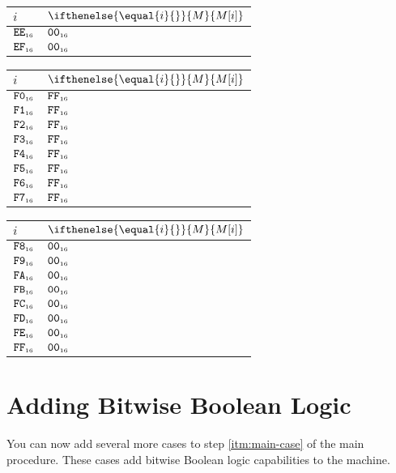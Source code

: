 \documentclass[a4paper,12pt]{article}
\makeatletter
\newcommand{\num}[1]{\texttt{#1}}
\newcommand{\hex}[1]{\num{#1}_{\textup{\tiny 16}}}
\newcommand{\MEM}[1]{\ifthenelse{\equal{#1}{}}{M}{M[#1]}}
\newenvironment{memtable}{%
  \begin{trivlist}
    \item
    }{%
    \end{trivlist}}
\newenvironment{memcolumn}{%
  \begin{tabular}{@{}ll@{}}
    $i$ & $\MEM{i}$ \\
    \hline}
    {%
    \hline
  \end{tabular}}
\newcommand{\memspace}{\qquad}
\makeatother
\begin{document}
\begin{memtable}
\begin{memcolumn}
    $\hex{EE}$ & $\hex{00}$ \\
    $\hex{EF}$ & $\hex{00}$ \\
  \end{memcolumn}
  \memspace
  \begin{memcolumn}
    $\hex{F0}$ & $\hex{FF}$ \\
    $\hex{F1}$ & $\hex{FF}$ \\
    $\hex{F2}$ & $\hex{FF}$ \\
    $\hex{F3}$ & $\hex{FF}$ \\
    $\hex{F4}$ & $\hex{FF}$ \\
    $\hex{F5}$ & $\hex{FF}$ \\
    $\hex{F6}$ & $\hex{FF}$ \\
    $\hex{F7}$ & $\hex{FF}$ \\
  \end{memcolumn}
  \memspace
  \begin{memcolumn}
    $\hex{F8}$ & $\hex{00}$ \\
    $\hex{F9}$ & $\hex{00}$ \\
    $\hex{FA}$ & $\hex{00}$ \\
    $\hex{FB}$ & $\hex{00}$ \\
    $\hex{FC}$ & $\hex{00}$ \\
    $\hex{FD}$ & $\hex{00}$ \\
    $\hex{FE}$ & $\hex{00}$ \\
    $\hex{FF}$ & $\hex{00}$ \\
  \end{memcolumn}
\end{memtable}

\section{Adding Bitwise Boolean Logic}

You can now add several more cases to step \ref{itm:main-case} of the main procedure.
These cases add bitwise Boolean logic capabilities to the machine.
\end{document}

